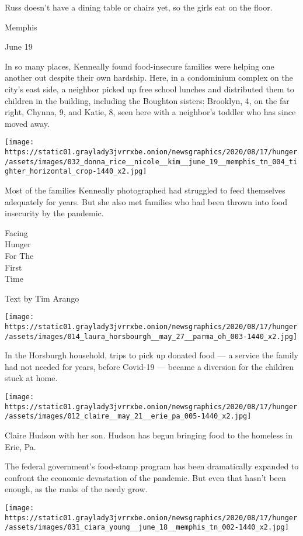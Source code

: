 Russ doesn't have a dining table or chairs yet, so the girls eat on the
floor.

Memphis

June 19

In so many places, Kenneally found food-insecure families were helping
one another out despite their own hardship. Here, in a condominium
complex on the city's east side, a neighbor picked up free school
lunches and distributed them to children in the building, including the
Boughton sisters: Brooklyn, 4, on the far right, Chynna, 9, and Katie,
8, seen here with a neighbor's toddler who has since moved away.

\texttt{[image: https://static01.graylady3jvrrxbe.onion/newsgraphics/2020/08/17/hunger/assets/images/032\_donna\_rice\_\_nicole\_\_kim\_\_june\_19\_\_memphis\_tn\_004\_tighter\_horizontal\_crop-1440\_x2.jpg]}

Most of the families Kenneally photographed had struggled to feed
themselves adequately for years. But she also met families who had been
thrown into food insecurity by the pandemic.

Facing\\
Hunger\\
For The\\
First\\
Time

Text by Tim Arango

\texttt{[image: https://static01.graylady3jvrrxbe.onion/newsgraphics/2020/08/17/hunger/assets/images/014\_laura\_horsbourgh\_\_may\_27\_\_parma\_oh\_003-1440\_x2.jpg]}

In the Horsburgh household, trips to pick up donated food --- a service
the family had not needed for years, before Covid-19 --- became a
diversion for the children stuck at home.

\texttt{[image: https://static01.graylady3jvrrxbe.onion/newsgraphics/2020/08/17/hunger/assets/images/012\_claire\_\_may\_21\_\_erie\_pa\_005-1440\_x2.jpg]}

Claire Hudson with her son. Hudson has begun bringing food to the
homeless in Erie, Pa.

The federal government's food-stamp program has been dramatically
expanded to confront the economic devastation of the pandemic. But even
that hasn't been enough, as the ranks of the needy grow.

\texttt{[image: https://static01.graylady3jvrrxbe.onion/newsgraphics/2020/08/17/hunger/assets/images/031\_ciara\_young\_\_june\_18\_\_memphis\_tn\_002-1440\_x2.jpg]}

